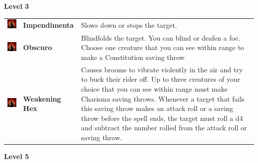 \textbf{Level 3} 
\begin{tabular}{ m{4cm}m{3cm}m{6cm} } 
	\includegraphics[width=4cm]{../Pictures/Gameplay/Spells/Icon/spell_icon.png} & \textbf{Impendimenta} & Slows down or stops the target.  \\ %
\includegraphics[width=4cm]{../Pictures/Gameplay/Spells/Icon/spell_icon.png} & \textbf{Obscuro} & Blindfolds the target. You can blind or deafen a foe. Choose one creature that you can see within range to make a Constitution saving throw \\ 
\includegraphics[width=4cm]{../Pictures/Gameplay/Spells/Icon/spell_icon.png} & \textbf{Weakening Hex} & Causes brooms to vibrate violently in the air and try to buck their rider off. Up to three creatures of your choice that you can see within range must make Charisma saving throws. Whenever a target that fails this saving throw makes an attack roll or a saving throw before the spell ends, the target must roll a d4 and subtract the number rolled from the attack roll or saving throw.\\ 
\end{tabular}
\textbf{Level 5 } 
